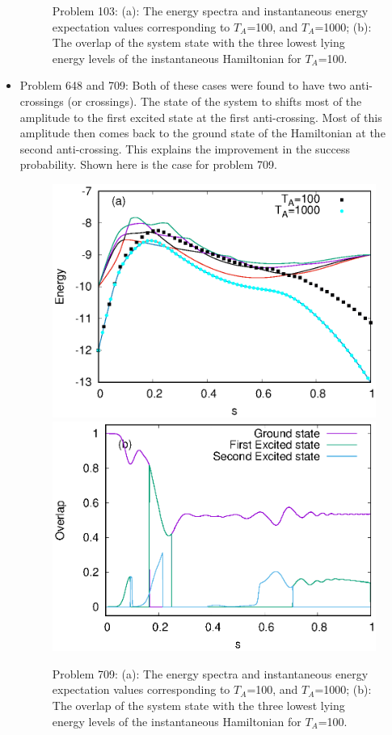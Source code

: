 \documentclass[../main.tex]{subfiles}
\begin{document}
\begin{appendices}
\begin{itemize}
\begin{figure}
\caption{Problem 103: (a): The energy spectra and instantaneous energy expectation values corresponding to $T_A$=100, and $T_A$=1000; (b): The overlap of the system state with the three lowest lying energy levels of the instantaneous Hamiltonian for $T_A$=100.}
\label{fig:ap6}
\end{figure}

\item Problem 648 and 709: Both of these cases were found to have two anti-crossings (or crossings). The state of the system to shifts most of the amplitude to the first excited state at the first anti-crossing. Most of this amplitude then comes back to the ground state of the Hamiltonian at the second anti-crossing. This explains the improvement in the success probability. Shown here is the case for problem 709.
\begin{figure}
\centering 
\includegraphics[scale=0.8]{709_A_g2.eps}
\includegraphics[scale=0.8]{709_A_g2_Overlap.eps}
\caption{Problem 709: (a): The energy spectra and instantaneous energy expectation values corresponding to $T_A$=100, and $T_A$=1000; (b): The overlap of the system state with the three lowest lying energy levels of the instantaneous Hamiltonian for $T_A$=100.}
\label{fig:ap7}
\end{figure}
\end{itemize}
\end{appendices}
\end{document}

